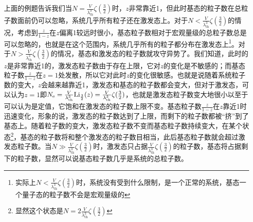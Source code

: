 \documentclass[../../main.tex]{subfiles}
\begin{document}
上面的例题告诉我们当\(N=\frac{V}{\lambda_{\mathrm{th}}^3}\zeta(\frac{3}{2})\)时，\(z\)非常靠近1，但此时基态的粒子数在总粒子数面前仍可以忽略，系统几乎所有粒子还在激发态上。对于\(N<\frac{V}{\lambda_{\mathrm{th}}^3}\zeta(\frac{3}{2})\)的情况，考虑到\(\frac{z}{1-z}\)在\(z\)偏离1较远时很小，基态粒子数相对于宏观量级的总粒子数总是可以忽略的，也就是在这个范围内，系统几乎所有的粒子都分布在激发态上\footnote{实际上\(N<\frac{V}{\lambda_{\mathrm{th}}^3}\zeta(\frac{3}{2})\)时，系统没有受到什么限制，是一个正常的系统，基态一个量子态的粒子数不会是宏观量级的}。对于\(N>\frac{V}{\lambda_{\mathrm{th}}^3}\zeta(\frac{3}{2})\)的情况，基态和激发态的粒子数就攻守异势了。我们知道，此时的\(z\)是非常靠近1的，激发态粒子数由于存在上限，它对\(z\)的变化是不敏感的；而基态粒子数\(\frac{z}{1-z}\)在\(z=1\)处发散，所以它对此时\(z\)的变化很敏感。也就是说随着系统粒子数的变大，\(z\)会越来越靠近1，激发态和基态的粒子数都会变大，但对于激发态，可以认为\(z=1\)即\(N_{\mathrm{e}}=\frac{V}{\lambda_{\mathrm{th}}^3}\mathrm{Li}_{\frac{3}{2}}(z)=\frac{V}{\lambda_{\mathrm{th}}^3}\zeta(\frac{3}{2})\)，也就是激发态粒子数变大地很小以至于可以认为是定值，它饱和在激发态的粒子数上限不变。基态粒子数\(\frac{z}{1-z}\)在\(z\)靠近1时迅速变化，形象的说，激发态的粒子数达到了上限，而剩下的粒子数都被“挤”到了基态上。随着粒子数的变大，激发态粒子数不变而基态粒子数持续变大，在某个状态\footnote{显然这个状态是\(N=2\frac{V}{\lambda_{\mathrm{th}}^3}\zeta(\frac{3}{2})\)}，基态的粒子数将和整个激发态的粒子数目相当，此后基态粒子数就会超过激发态粒子数。当\(N\gg \frac{V}{\lambda_{\mathrm{th}}^3}\zeta(\frac{3}{2})\)时，激发态只占据\(\frac{V}{\lambda_{\mathrm{th}}^3}\zeta(\frac{3}{2})\)的粒子数，基态将占据剩下的粒子数，显然可以说基态粒子数几乎是系统的总粒子数。
\end{document}
